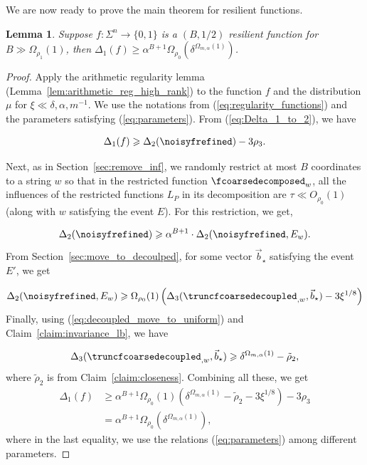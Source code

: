 \documentclass[11pt]{article}
\newtheorem{lemma}[thm]{Lemma}
\renewcommand\geq{\geqslant}
\newcommand{\V}[1]{{#1}}
\begin{document}
We are now ready to prove the main theorem for resilient functions.
\begin{lemma}\label{lemma:mainthm_resilient_f}
    Suppose $f:\Sigma^n \rightarrow \{0,1\}$ is a $(B, 1/2)$ resilient function for $B \gg \Omega_{\rho_1}(1)$, then $\Delta_1(f)\geq  \alpha^{B+1} \Omega_{\rho_0}(\delta^{\Omega_{m,\alpha}(1)})$.
\end{lemma}
\begin{proof}
    Apply the arithmetic regularity lemma (Lemma~\ref{lem:arithmetic_reg_high_rank}) to the function $f$ and the distribution $\mu$ for $\xi\ll \delta,\alpha, m^{-1}$. We use the notations from (\ref{eq:regularity_functions}) and the parameters satisfying (\ref{eq:parameters}). From (\ref{eq:Delta_1_to_2}), we have
    
    $$\Delta_1(f) \geq \Delta_2(\noisyfrefined)  - 3\rho_3.$$

    Next, as in Section~\ref{sec:remove_inf}, we randomly restrict at most $B$ coordinates to a string $\V w$ so that in the restricted function $\fcoarsedecomposed_{\V w}$, all the influences of the restricted functions $L_P$ in its decomposition are $\tau  \ll O_{\rho_0}(1)$ (along with $\V w$ satisfying the event $E$). For this restriction, we get,
    
    $$\Delta_2(\noisyfrefined) \geq \alpha^{B+1}\cdot \Delta_2(\noisyfrefined, E_{\V w}).$$
   From Section~\ref{sec:move_to_decoulped}, for some vector $\vec{b}_\star$ satisfying the event $E'$, we get

    $$ \Delta_2(\noisyfrefined, E_{\V w}) \geq \Omega_{\rho_0}(1)\left(\Delta_3(\truncfcoarsedecoupled_{, \V w}, \vec{b}_\star) - 3\xi^{1/8}\right)$$
    Finally, using (\ref{eq:decoupled_move_to_uniform}) and Claim~\ref{claim:invariance_lb}, we have

$$\Delta_3(\truncfcoarsedecoupled_{, \V w}, \vec{b}_\star)\geq \delta^{\Omega_{m,\alpha}(1)} -\tilde{\rho}_2,$$
where $\tilde{\rho}_2$ is from Claim~\ref{claim:closeness}. Combining all these, we get
\begin{align*}
\Delta_1(f) &\geq  \alpha^{B+1} \Omega_{\rho_0}(1)\left( \delta^{\Omega_{m,\alpha}(1)} -\tilde{\rho}_2 - 3\xi^{1/8}\right) - 3\rho_3\\
& = \alpha^{B+1} \Omega_{\rho_0}(\delta^{\Omega_{m,\alpha}(1)}),
\end{align*}
where in the last equality, we use the relations (\ref{eq:parameters}) among different parameters. 
\end{proof}
\end{document}

